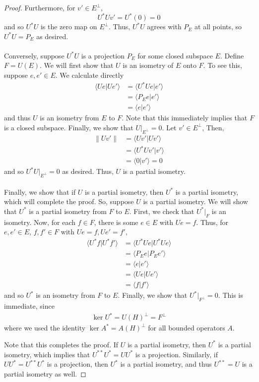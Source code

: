 \documentclass[fontsize=11pt]{scrartcl} %
\numberwithin{equation}{section} %
\numberwithin{figure}{section} %
\numberwithin{table}{section} %
\begin{document}
\begin{proof}
    Furthermore, for $v'\in E^{\perp}$,
    \[
        U^*Uv'=U^*(0) = 0
    \]
    and so $U^*U$ is the zero map on $E^{\perp}$. Thus, $U^*U$ agrees with $P_E$
    at all points, so $U^*U=P_E$ as desired.
    \\
    \\
    Conversely, suppose $U^*U$ is a projection $P_E$ for some closed subspace
    $E$. Define $F=U(E)$. We will first show that $U$ is an isometry of $E$ onto
    $F$. To see this, suppose $e,e'\in E$. We calculate directly
    \[
\begin{aligned}
    \langle Ue|Ue'\rangle &= \langle U^*Ue|e'\rangle\\
    &=\langle P_Ee|e'\rangle\\
    &=\langle e|e'\rangle
\end{aligned}
    \]
    and thus $U$ is an isometry from $E$ to $F$. Note that this immediately
    implies that $F$ is a closed subspace. Finally, we show that
    $U|_{E^{\perp}}=0$. Let $v'\in E^{\perp}$, Then,
    \[
\begin{aligned}
    \|Uv'\| &=\langle Uv'|Uv'\rangle\\
    &=\langle U^*Uv'|v'\rangle\\
    &=\langle 0|v'\rangle = 0
\end{aligned}
    \]
    and so $U^*U|_{E^{\perp}}=0$ as desired. Thus, $U$ is a partial isometry.
    \\
    \\
    Finally, we show that if $U$ is a partial isometry, then $U^*$ is a partial
    isometry, which will complete the proof. So, suppose $U$ is a partial
    isometry. We will show that $U^*$ is a partial isometry from $F$ to $E$.
    First, we check that $U^*|_F$ is an isometry. Now, for each $f\in F$, there
    is some $e\in E$ with $Ue=f$. Thus, for $e,e'\in E$, $f,f'\in F$ with
    $Ue=f,Ue'=f'$,
    \[
        \begin{aligned}
            \langle U^*f|U^*f'\rangle &= \langle U^*Ue|U^*Ue\rangle\\
            &=\langle P_Ee|P_Ee'\rangle\\
            &=\langle e|e'\rangle\\
            &=\langle Ue|Ue'\rangle\\
            &=\langle f|f'\rangle
        \end{aligned}
    \]
    and so $U^*$ is an isometry from $F$ to $E$.
    Finally, we show that $U^*|_{F^{\perp}}=0$. This is immediate, since
    \[
        \begin{aligned}
            \ker U^* = U(H)^{\perp} = F^{\perp}
        \end{aligned}
    \]
    where we used the identity $\ker A^* = A(H)^{\perp}$ for all bounded
    operators $A$. 

    Note that this completes the proof. If $U$ is a partial isometry, then $U^*$
    is a partial isometry, which implies that $U^{**}U^*=UU^*$ is a projection.
    Similarly, if $UU^*=U^{**}U^*$ is a projection, then $U^*$ is a partial
    isometry, and thus $U^{**}=U$ is a partial isometry as well.
\end{proof}
\end{document}
